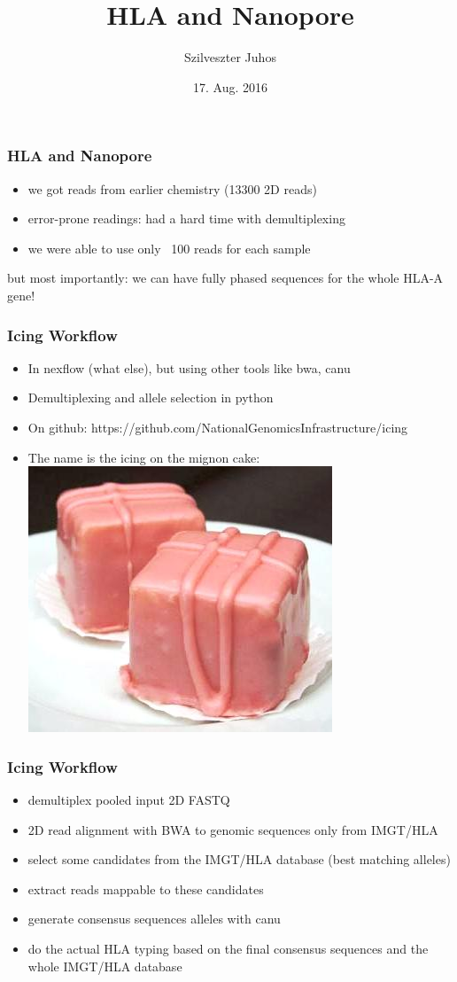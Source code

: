 \documentclass{beamer}
\title{HLA and Nanopore}
\author{Szilveszter Juhos}
\institute{SciLifeLab}
\date{17. Aug. 2016 }
\begin{document}
\frame{\titlepage}
			  
\begin{frame}
\frametitle{HLA and Nanopore}
\begin{itemize}
	\item we got reads from earlier chemistry (13300 2D reads)
	\item error-prone readings: had a hard time with demultiplexing
	\item we were able to use only ~100 reads for each sample
\end{itemize}

\begin{block}{but most importantly:}
we can have fully phased sequences for the whole HLA-A gene! 
\end{block}
\end{frame}

\begin{frame}
\frametitle{Icing Workflow}
\begin{itemize}
	\item In nexflow (what else), but using other tools like bwa, canu
	\item Demultiplexing and allele selection in python
	\item On github: https://github.com/NationalGenomicsInfrastructure/icing
	\item The name is the icing on the mignon cake: \includegraphics[width=0.3\linewidth]{minyon.jpg}
\end{itemize}
\end{frame}

\begin{frame}
\frametitle{Icing Workflow}
\begin{itemize}
	\item demultiplex pooled input 2D FASTQ
	\item 2D read alignment with BWA to genomic sequences only from IMGT/HLA
	\item select some candidates from the IMGT/HLA database (best matching alleles)
	\item extract reads mappable to these candidates
	\item generate consensus sequences alleles with canu
	\item do the actual HLA typing based on the final consensus sequences and the whole IMGT/HLA database
\end{itemize}
\end{frame}
\end{document}
